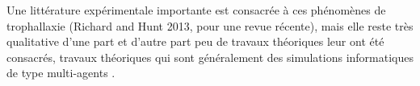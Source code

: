 Une littérature expérimentale importante est consacrée à ces phénomènes de trophallaxie (Richard and Hunt 2013, pour une revue récente), mais elle reste très qualitative d'une part et d'autre part peu de travaux théoriques leur ont été consacrés, travaux théoriques qui sont généralement des simulations informatiques de type multi-agents \citep{schmickl_trophallaxis_2007}.

%
%
%

